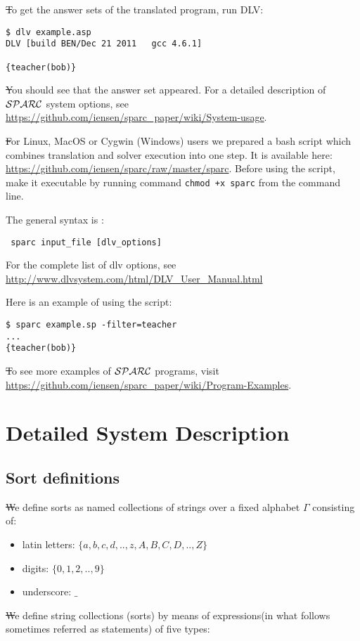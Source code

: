 \documentclass[12pt, letterpaper]{article}
\begin{document}
\st To get the answer sets of the translated program, run DLV:

\begin{verbatim}
$ dlv example.asp
DLV [build BEN/Dec 21 2011   gcc 4.6.1]

{teacher(bob)}
\end{verbatim}

\st You should see that the answer set appeared. For a detailed description of ${\cal SPARC}$ system options, see 
\url{https://github.com/iensen/sparc_paper/wiki/System-usage}.

\st For Linux, MacOS or Cygwin (Windows) users we prepared a bash script which combines translation and solver execution into one step.
It is available here: \url{https://github.com/iensen/sparc/raw/master/sparc}. Before using the script, make it executable by running command
\texttt{chmod +x sparc} from the command line.

The general syntax is :
\begin{verbatim}
 sparc input_file [dlv_options]
\end{verbatim}
For the complete list of dlv options, see 
\url{http://www.dlvsystem.com/html/DLV_User_Manual.html }

Here is an example of using the script:
\begin{verbatim}
$ sparc example.sp -filter=teacher
...
{teacher(bob)}
\end{verbatim}
\st To see more examples of ${\cal SPARC}$ programs, visit \url{https://github.com/iensen/sparc_paper/wiki/Program-Examples}.
\section{Detailed System Description}

\subsection{Sort definitions}



\st We define sorts as named collections of strings over a fixed alphabet $\Gamma$ consisting of:
\begin{itemize}
 \item latin letters: $\{a,b,c,d,..,z,A,B,C,D,..,Z\}$
 \item digits: $\{0,1,2,..,9\}$
 \item underscore: $\_$
\end{itemize}

\st We define string collections (sorts) by means of expressions(in what follows sometimes referred as statements) of five types:
\end{document}
